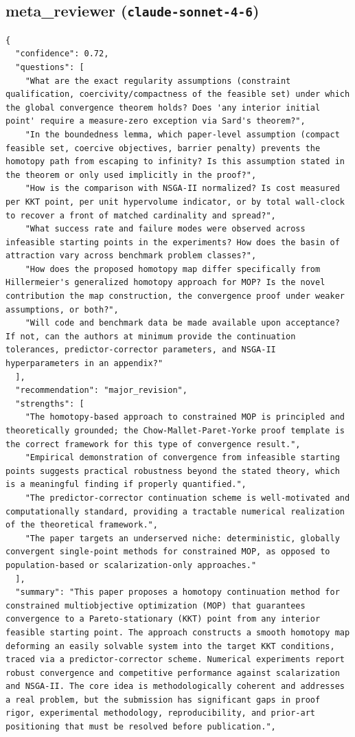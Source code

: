 \documentclass[11pt]{article}
\begin{document}
\subsection*{meta_reviewer (\texttt{claude-sonnet-4-6})}
\begin{verbatim}
{
  "confidence": 0.72,
  "questions": [
    "What are the exact regularity assumptions (constraint qualification, coercivity/compactness of the feasible set) under which the global convergence theorem holds? Does 'any interior initial point' require a measure-zero exception via Sard's theorem?",
    "In the boundedness lemma, which paper-level assumption (compact feasible set, coercive objectives, barrier penalty) prevents the homotopy path from escaping to infinity? Is this assumption stated in the theorem or only used implicitly in the proof?",
    "How is the comparison with NSGA-II normalized? Is cost measured per KKT point, per unit hypervolume indicator, or by total wall-clock to recover a front of matched cardinality and spread?",
    "What success rate and failure modes were observed across infeasible starting points in the experiments? How does the basin of attraction vary across benchmark problem classes?",
    "How does the proposed homotopy map differ specifically from Hillermeier's generalized homotopy approach for MOP? Is the novel contribution the map construction, the convergence proof under weaker assumptions, or both?",
    "Will code and benchmark data be made available upon acceptance? If not, can the authors at minimum provide the continuation tolerances, predictor-corrector parameters, and NSGA-II hyperparameters in an appendix?"
  ],
  "recommendation": "major_revision",
  "strengths": [
    "The homotopy-based approach to constrained MOP is principled and theoretically grounded; the Chow-Mallet-Paret-Yorke proof template is the correct framework for this type of convergence result.",
    "Empirical demonstration of convergence from infeasible starting points suggests practical robustness beyond the stated theory, which is a meaningful finding if properly quantified.",
    "The predictor-corrector continuation scheme is well-motivated and computationally standard, providing a tractable numerical realization of the theoretical framework.",
    "The paper targets an underserved niche: deterministic, globally convergent single-point methods for constrained MOP, as opposed to population-based or scalarization-only approaches."
  ],
  "summary": "This paper proposes a homotopy continuation method for constrained multiobjective optimization (MOP) that guarantees convergence to a Pareto-stationary (KKT) point from any interior feasible starting point. The approach constructs a smooth homotopy map deforming an easily solvable system into the target KKT conditions, traced via a predictor-corrector scheme. Numerical experiments report robust convergence and competitive performance against scalarization and NSGA-II. The core idea is methodologically coherent and addresses a real problem, but the submission has significant gaps in proof rigor, experimental methodology, reproducibility, and prior-art positioning that must be resolved before publication.",

\end{verbatim}
\end{document}
